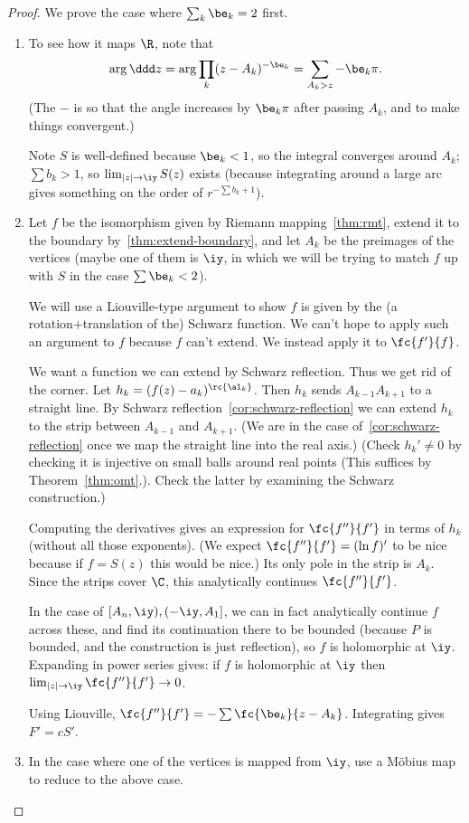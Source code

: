 \begin{proof}
We prove the case where $\sum_k \be_k=2$ first.
\begin{enumerate}
\item
To see how it maps $\R$, note that 
\[
\arg \ddd z = \arg \prod_k (z-A_k)^{-\be_k} = \sum_{A_k>z} -\be_k\pi.
\]
(The $-$ is so that the angle increases by $\be_k\pi$ after passing $A_k$, and to make things convergent.)

Note $S$ is well-defined because $\be_k<1$, so the integral converges around $A_k$; $\sum b_k>1$, so $\lim_{|z|\to \iy}S(z)$ exists (because integrating around a large arc gives something on the order of $r^{-\sum b_k +1}$). 
\item
Let $f$ be the isomorphism given by Riemann mapping~\ref{thm:rmt}, extend it to the boundary by~\ref{thm:extend-boundary}, and let $A_k$ be the preimages of the vertices (maybe one of them is $\iy$, in which we will be trying to match $f$ up with $S$ in the case $\sum \be_k<2$). 

We will use a Liouville-type argument to show $f$ is given by the (a rotation+translation of the) Schwarz function. We can't hope to apply such an argument to $f$ because $f$ can't extend. We instead apply it to $\fc{f'}{f}$. 

We want a function we can extend by Schwarz reflection. Thus we get rid of the corner. Let $h_k = (f(z) - a_k)^{\rc{\al_k}}$. Then $h_k$ sends $A_{k-1}A_{k+1}$ to a straight line. By Schwarz reflection~\ref{cor:schwarz-reflection} we can extend $h_k$ to the strip between $A_{k-1}$ and $A_{k+1}$. (We are in the case of~\ref{cor:schwarz-reflection} once we map the straight line into the real axis.) (Check $h_k'\ne 0$ by checking it is injective on small balls around real points (This suffices by Theorem~\ref{thm:omt}.). Check the latter by examining the Schwarz construction.)

Computing the derivatives gives an expression for $\fc{f''}{f'}$ in terms of $h_k$ (without all those exponents). (We expect $\fc{f''}{f'}=(\ln f)'$ to be nice because if $f=S(z)$ this would be nice.) Its only pole in the strip is $A_k$. Since the strips cover $\C$, this analytically continues $\fc{f''}{f'}$.

In the case of $[A_n,\iy), (-\iy,A_1]$, we can in fact analytically continue $f$ across these, and find its continuation there to be bounded (because $P$ is bounded, and the construction is just reflection), so $f$ is holomorphic at $\iy$. Expanding in power series gives: if $f$ is holomorphic at $\iy$ then $\lim_{|z|\to \iy}\fc{f''}{f'}\to 0$.

Using Liouville, $\fc{f''}{f'}=-\sum \fc{\be_k}{z-A_k}$. Integrating gives $F'=cS'$.
\item In the case where one of the vertices is mapped from $\iy$, use a M\"obius map to reduce to the above case.
\end{enumerate}
\end{proof}

